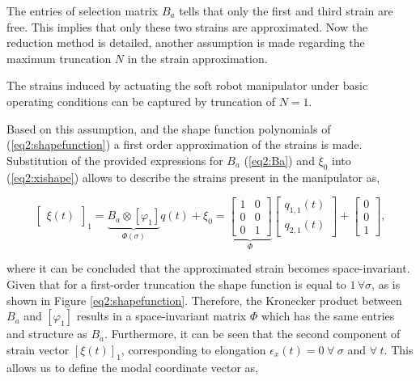 The entries of selection matrix $B_a$ tells that only the first and third strain are free. This implies that only these two strains are approximated. Now the reduction method is detailed, another assumption is made regarding the maximum truncation $N$ in the strain approximation.

\begin{theorem}
The strains induced by actuating the soft robot manipulator under basic operating conditions can be captured by truncation of $N = 1$. 
\end{theorem}

Based on this assumption, and the shape function polynomials of (\ref{eq2:shapefunction}) a first order approximation of the strains is made. Substitution of the provided expressions for $B_a$ (\ref{eq2:Ba}) and $\xi_0$ into (\ref{eq2:xishape}) allows to describe the strains present in the manipulator as,


\begin{equation}
    \begin{bmatrix}\xi(t)\end{bmatrix}_1 =\underbrace{B_a \otimes [\varphi_1]}_{\Phi(\sigma)} q(t) + \xi_0  =  \underbrace{\begin{bmatrix}
    1 & 0  \\
    0 & 0  \\
    0 & 1
    \end{bmatrix}}_{\Phi} \begin{bmatrix} q_{1,1}(t) \\  q_{2,1}(t) \end{bmatrix} +  \begin{bmatrix} 0 \\ 0 \\ 1   \end{bmatrix},
\label{eq2:xiapprox}
\end{equation}

where it can be concluded that the approximated strain becomes space-invariant. Given that for a first-order truncation the shape function is equal to $1 \hspace{2pt} \forall \sigma$, as is shown in Figure \ref{eq2:shapefunction}. Therefore, the Kronecker product between $B_a$ and $[\varphi_1]$ results in a space-invariant matrix $\Phi$ which has the same entries and structure as $B_a$. Furthermore, it can be seen that the second component of strain vector $[\xi(t)]_1$, corresponding to elongation $\epsilon_x(t) = 0 \hspace{3pt} \forall \hspace{3pt} \sigma $ and $ \forall \hspace{3pt} t$. This allows us to define the modal coordinate vector as,



